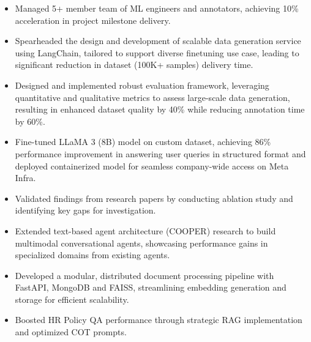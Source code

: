 \documentclass[10pt,a4paper,ragged2e,withhyper]{altacv}
\begin{document}
\begin{itemize}
\item Managed 5+ member team of ML engineers and annotators, achieving 10\% acceleration in project milestone delivery.
\end{itemize}
\begin{itemize}
\item Spearheaded the design and development of scalable data generation service using LangChain, tailored to support diverse finetuning use case, leading to significant reduction in dataset (100K+ samples) delivery time.
\item Designed and implemented robust evaluation framework, leveraging quantitative and qualitative metrics to assess large-scale data generation, resulting in enhanced dataset quality by 40\% while reducing annotation time by 60\%.
\item Fine-tuned LLaMA 3 (8B) model on custom dataset, achieving 86\% performance improvement in answering user queries in structured format and deployed containerized model for seamless company-wide access on Meta Infra.
\end{itemize}

\begin{itemize}
\item Validated findings from research papers by conducting ablation study and identifying key gaps for investigation.
\item Extended text-based agent architecture (COOPER) research to build multimodal conversational agents, showcasing performance gains in specialized domains from existing agents.
\end{itemize}

\begin{itemize}
\item Developed a modular, distributed document processing pipeline with FastAPI, MongoDB and FAISS, streamlining embedding generation and storage for efficient scalability.
\item Boosted HR Policy QA performance through strategic RAG implementation and optimized COT prompts.
\end{itemize}


\par
\end{document}
